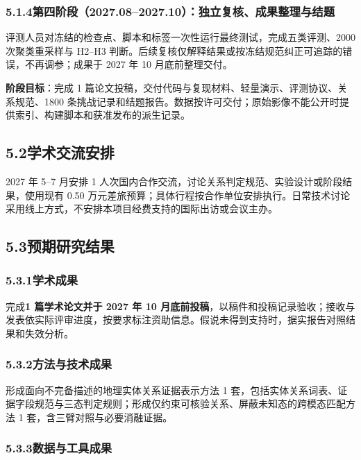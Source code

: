 \subsubsection*{5.1.4\quad 第四阶段（2027.08--2027.10）：独立复核、成果整理与结题}

评测人员对冻结的检查点、脚本和标签一次性运行最终测试，完成五类评测、2000 次聚类重采样与 H2--H3 判断。后续复核仅解释结果或按冻结规范纠正可追踪的错误，不再调参；成果于 2027 年 10 月底前整理交付。

\textbf{阶段目标}：完成 1 篇论文投稿，交付代码与复现材料、轻量演示、评测协议、关系规范、1800 条挑战记录和结题报告。数据按许可交付；原始影像不能公开时提供索引、构建脚本和获准发布的派生记录。

\subsection*{5.2\quad 学术交流安排}

2027 年 5--7 月安排 1 人次国内合作交流，讨论关系判定规范、实验设计或阶段结果，使用现有 0.50 万元差旅预算；具体行程按合作单位安排执行。日常技术讨论采用线上方式，不安排本项目经费支持的国际出访或会议主办。

\subsection*{5.3\quad 预期研究结果}

\subsubsection*{5.3.1\quad 学术成果}

完成\textbf{1 篇学术论文并于 2027 年 10 月底前投稿}，以稿件和投稿记录验收；接收与发表依实际评审进度，按要求标注资助信息。假说未得到支持时，据实报告对照结果和失效分析。

\subsubsection*{5.3.2\quad 方法与技术成果}

形成面向不完备描述的地理实体关系证据表示方法 1 套，包括实体关系词表、证据字段规范与三态判定规则；形成仅约束可核验关系、屏蔽未知态的跨模态匹配方法 1 套，含三臂对照与必要消融证据。

\subsubsection*{5.3.3\quad 数据与工具成果}

